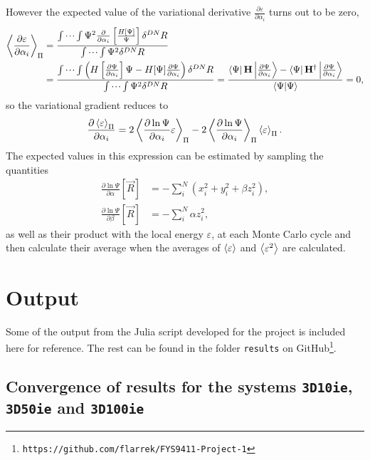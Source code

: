 \documentclass[a4paper,8pt]{article}
\begin{document}
However the expected value of the variational derivative $\frac{\partial\varepsilon}{\partial\alpha_i}$ turns out to be zero,
\begin{align}
\ev{\frac{\partial\varepsilon}{\partial\alpha_i}}_\Pi &= \frac{\idotsint\Psi^2\frac{\partial}{\partial\alpha_i}\left[\frac{H[\Psi]}{\Psi}\right]\delta^{DN}R}{\idotsint \Psi^2 \delta^{DN}R} \nonumber\\
&= \frac{\idotsint\left(H\left[\frac{\partial\Psi}{\partial\alpha_i}\right]\Psi-H[\Psi]\frac{\partial\Psi}{\partial\alpha_i}\right)\delta^{DN}R}{\idotsint \Psi^2 \delta^{DN}R} = \frac{\bra{\Psi}\mathbf{H}\ket{\frac{\partial\Psi}{\partial\alpha_i}}-\bra{\Psi}\mathbf{H}^\dagger\ket{\frac{\partial\Psi}{\partial\alpha_i}}}{\braket{\Psi}{\Psi}} = 0,
\end{align}
so the variational gradient reduces to
\begin{equation}
\frac{\partial\ev{\varepsilon}_\Pi}{\partial\alpha_i} = 2\ev{\frac{\partial\ln\Psi}{\partial\alpha_i}\varepsilon}_\Pi-2\ev{\frac{\partial\ln\Psi}{\partial\alpha_i}}_\Pi\ev{\varepsilon}_\Pi.
\end{equation}
The expected values in this expression can be estimated by sampling the quantities
\begin{align}
\frac{\partial\ln\Psi}{\partial\alpha}[\vec{R}] &= -\sum\limits_i^N \left(x_i^2 + y_i^2 + \beta z_i^2\right), \label{compAlphaGrad}\\
\frac{\partial\ln\Psi}{\partial\beta}[\vec{R}] &= -\sum\limits_i^N \alpha z_i^2, \label{compBetaGrad}
\end{align}
as well as their product with the local energy $\varepsilon$, at each Monte Carlo cycle and then calculate their average when the averages of $\ev{\varepsilon}$ and $\ev{\varepsilon^2}$ are calculated.


\newpage
\section{Output}\label{output}
Some of the output from the Julia script developed for the project is included here for reference. The rest can be found in the folder \texttt{results} on GitHub\footnote{\texttt{https://github.com/flarrek/FYS9411-Project-1}}.

\subsection{Convergence of results for the systems \texttt{3D10ie}, \texttt{3D50ie} and \texttt{3D100ie}}\label{convOutput}
\end{document}
